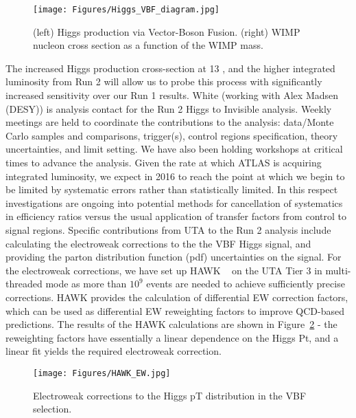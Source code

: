 \begin{figure}[htb]
\centering

      \texttt{[image: Figures/Higgs\_VBF\_diagram.jpg]}
      \label{fig:Higgs_VBF_diagram}

\caption{(left) Higgs production via Vector-Boson Fusion. (right) WIMP nucleon cross section as a function of the WIMP mass.}
\end{figure}


The increased Higgs production cross-section at 13 \TeV, and the higher integrated luminosity from Run 2 will allow us to probe this process
with significantly increased sensitivity over our Run 1 results. White (working with Alex Madsen (DESY)) is analysis contact for the
Run 2 Higgs to Invisible analysis. Weekly meetings are held to coordinate the contributions to the analysis: data/Monte Carlo samples and 
comparisons, trigger(s), control regions specification, theory uncertainties, and limit setting. We have also been holding workshops 
at critical times to advance the analysis. 
Given the rate at which ATLAS is acquiring integrated luminosity, we expect in 2016 to reach the point at which we begin to be limited by 
systematic errors rather than statistically limited. In this respect investigations are ongoing into potential methods
for cancellation of systematics in efficiency ratios versus the usual application of transfer factors from control to signal regions.
Specific contributions from UTA to the Run 2 analysis include calculating the electroweak corrections to the the VBF Higgs signal, and
providing the parton distribution function (pdf) uncertainties on the signal. For the electroweak corrections, we have set up HAWK ~\cite{HAWK} 
on the UTA Tier 3 in multi-threaded 
mode as more than $10^{9}$ events are needed to achieve sufficiently precise corrections. HAWK provides the calculation of differential 
EW correction factors, which can be used as differential EW reweighting factors to improve QCD-based predictions. The results of the HAWK
calculations are shown in Figure~\ref{fig:HAWK_EW} - the reweighting factors have essentially a linear dependence on the Higgs Pt, and a linear fit
yields the required electroweak correction. 

\begin{figure}[htb]
\centering

      \texttt{[image: Figures/HAWK\_EW.jpg]}
      \label{fig:HAWK_EW}

\caption{Electroweak corrections to the Higgs pT distribution in the VBF selection.}
\end{figure}

